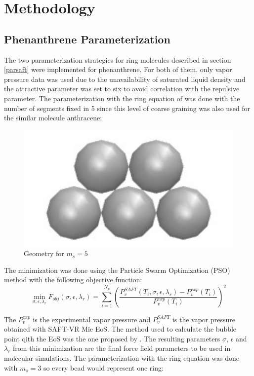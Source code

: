 \chapter{Methodology} %

\label{Chapter4} %

\section{Phenanthrene Parameterization}\label{parame}

The two parameterization strategies for ring molecules described in section \ref{parsaft} were implemented for phenanthrene. For both of them, only vapor pressure data \cite{pvphen} was used due to the unavailability of saturated liquid density and the attractive parameter was set to six to avoid correlation with the repulsive parameter. The parameterization with the ring equation of  was done with the number of segments fixed in 5 since this level of coarse graining was also used for the similar molecule anthracene:
\begin{figure}[th]
\centering
\includegraphics[width=0.25\linewidth]{Figures/fen5}
\caption{Geometry for $m_{s}=5$}
\label{fig:fen5}
\end{figure}

The minimization was done using the Particle Swarm Optimization (PSO) method with the following objective function:
\begin{equation}
\min\limits_{\sigma,\epsilon,\lambda_{r}} F_{obj}(\sigma,\epsilon,\lambda_{r})= \sum_{i=1}^{N_{p}} \left(\frac{P_{v}^{SAFT}(T_{i},\sigma,\epsilon,\lambda_{r})-P_{v}^{exp}(T_{i})}{P_{v}^{exp}(T_{i})} \right)^2
\label{eqn:fobjm}
\end{equation}

The $P_{v}^{exp}$ is the experimental vapor pressure and $P_{v}^{SAFT}$ is the vapor pressure obtained with SAFT-VR Mie EoS. The method used to calculate the bubble point qith the EoS was the one proposed by . The resulting  parameters $\sigma$, $\epsilon $ and $\lambda _{r}$ from this minimization are the final force field parameters to be used in molecular simulations. The parameterization with the  ring equation was done with $m_{s}=3$ so every bead would represent one ring:

